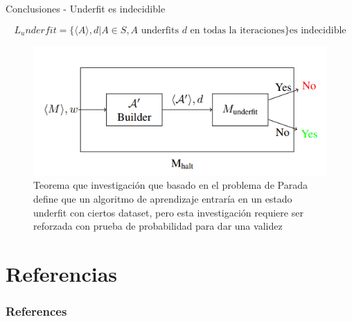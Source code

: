 \documentclass[11pt]{beamer}
\begin{document}
		\begin{frame}{Conclusiones - Underfit es indecidible}
			\justifying
			
			\[ 
			    L_underfit = \{\langle A \rangle, d|A \in S, A \text{ underfits $d$ en todas la iteraciones}\} \text{es indecidible}
			\]
			
			\begin{figure}[H]
				\centering
				\includegraphics[scale=0.45]{img/underfit.PNG}
				\caption{
				Teorema que investigación que basado en el problema de Parada \cite{Sehra2021} define que un algoritmo de aprendizaje entraría en un estado underfit con ciertos dataset, pero esta investigación requiere ser reforzada con prueba de probabilidad para dar una validez}
				\label{fig: underfit}
			\end{figure}
			
			
			
		\end{frame}
		
		
	

	

\section{Referencias}



\begin{frame}[t, allowframebreaks]
    \frametitle{References}
    
    
\end{frame}
\end{document}
